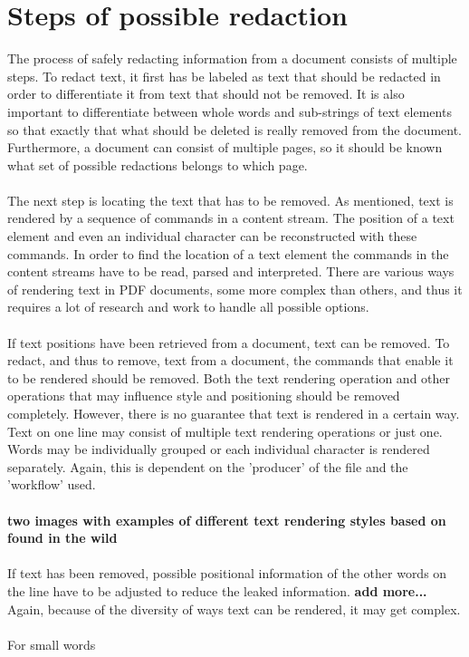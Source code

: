 \section{Steps of possible redaction}
The process of safely redacting information from a document consists of multiple steps. To redact text, it first has be labeled as text that should be redacted in order to differentiate it from text that should not be removed. It is also important to differentiate between whole words and sub-strings of text elements so that exactly that what should be deleted is really removed from the document. Furthermore, a document can consist of multiple pages, so it should be known what set of possible redactions belongs to which page. 
\\\\
The next step is locating the text that has to be removed. As mentioned, text is rendered by a sequence of commands in a content stream. The position of a text element and even an individual character can be reconstructed with these commands. In order to find the location of a text element the commands in the content streams have to be read, parsed and interpreted. There are various ways of rendering text in PDF documents, some more complex than others, and thus it requires a lot of research and work to handle all possible options. 
\\\\
If text positions have been retrieved from a document, text can be removed. To redact, and thus to remove, text from a document, the commands that enable it to be rendered should be removed. Both the text rendering operation and other operations that may influence style and positioning should be removed completely. However, there is no guarantee that text is rendered in a certain way. Text on one line may consist of multiple text rendering operations or just one. Words may be individually grouped or each individual character is rendered separately. Again, this is dependent on the 'producer' of the file and the 'workflow' used. 
\\\\
\textbf{two images with examples of different text rendering styles based on found in the wild}
\\\\
If text has been removed, possible positional information of the other words on the line have to be adjusted to reduce the leaked information. \textbf{add more...} Again, because of the diversity of ways text can be rendered, it may get complex. 
\\\\
For small words